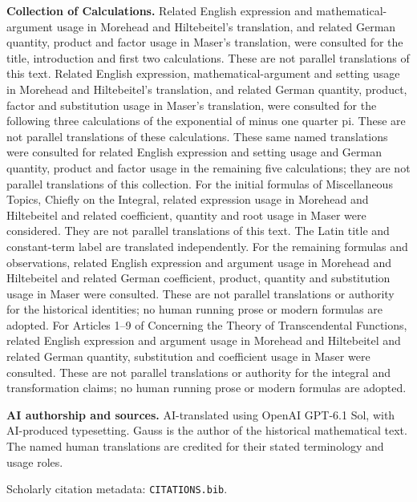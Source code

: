 \par\medskip\textbf{Collection of Calculations.} Related English expression and mathematical-argument usage in Morehead and Hiltebeitel’s translation, and related German quantity, product and factor usage in Maser’s translation, were consulted for the title, introduction and first two calculations. These are not parallel translations of this text.
 Related English expression, mathematical-argument and setting usage in Morehead and Hiltebeitel’s translation, and related German quantity, product, factor and substitution usage in Maser’s translation, were consulted for the following three calculations of the exponential of minus one quarter pi. These are not parallel translations of these calculations.
 These same named translations were consulted for related English expression and setting usage and German quantity, product and factor usage in the remaining five calculations; they are not parallel translations of this collection.
 For the initial formulas of Miscellaneous Topics, Chiefly on the Integral, related expression usage in Morehead and Hiltebeitel and related coefficient, quantity and root usage in Maser were considered. They are not parallel translations of this text. The Latin title and constant-term label are translated independently.
 For the remaining formulas and observations, related English expression and argument usage in Morehead and Hiltebeitel and related German coefficient, product, quantity and substitution usage in Maser were consulted. These are not parallel translations or authority for the historical identities; no human running prose or modern formulas are adopted.
 For Articles 1--9 of Concerning the Theory of Transcendental Functions, related English expression and argument usage in Morehead and Hiltebeitel and related German quantity, substitution and coefficient usage in Maser were consulted. These are not parallel translations or authority for the integral and transformation claims; no human running prose or modern formulas are adopted.
\par\medskip\textbf{AI authorship and sources.} AI-translated using OpenAI GPT-6.1 Sol, with AI-produced typesetting. Gauss is the author of the historical mathematical text. The named human translations are credited for their stated terminology and usage roles.
\par\medskip Scholarly citation metadata: \texttt{CITATIONS.bib}.
\par\endgroup\clearpage

